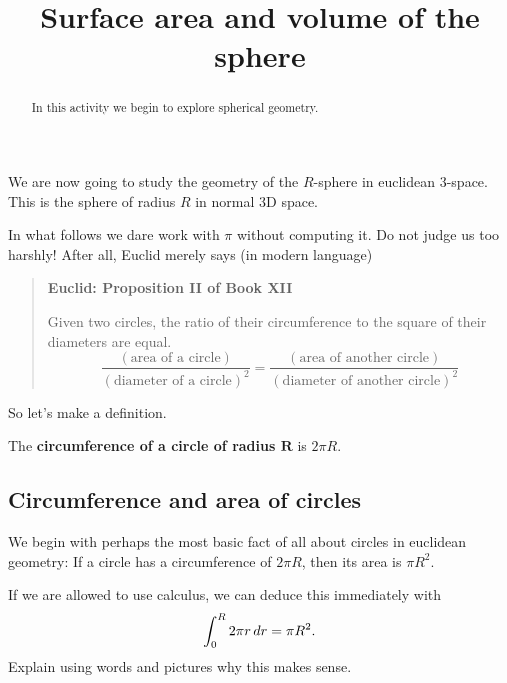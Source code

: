 \documentclass[newpage,hints,handout,noauthor,nooutcomes,12pt]{ximera}
\title{Surface area and volume of the sphere}
\begin{document}
\begin{abstract}
In this activity we begin to explore spherical geometry.
\end{abstract}
\maketitle


We are now going to study the geometry of the $R$-sphere in euclidean
$3$-space. This is the sphere of radius $R$ in normal $3$D space.



In what follows we dare work with $\pi$ without computing it. Do not
judge us too harshly! After all, Euclid merely says (in modern language)
\begin{quote}
  \textbf{Euclid: Proposition II of Book XII}
  
  Given two circles, the ratio of their circumference to the square of
  their diameters are equal.
  \[
  \frac{(\text{area of a circle})}{(\text{diameter of a circle})^2} =
  \frac{(\text{area of another circle})}{(\text{diameter of another
      circle})^2}
  \]
\end{quote}

So let's make a definition.

\begin{definition}
  The \textbf{circumference of a circle of radius $\boldsymbol R$} is $2\pi R$.
\end{definition}

\subsection{Circumference and area of circles}

We begin with perhaps the most basic fact of all about circles in
euclidean geometry: If a circle has a circumference of $2\pi R$, then
its area is $\pi R^2$.

\begin{problem}
  If we are allowed to use calculus, we can deduce this immediately with
  \[
  \int_0^R 2\pi r \,d r = \pi R^2.
  \]
  Explain using words and pictures why this makes sense.
\end{problem}
\end{document}
